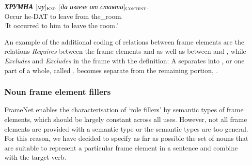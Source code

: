 \documentclass[output=paper,colorlinks,citecolor=brown]{langscibook}
\begin{document}
\begin{exe}
 \ex  \label{ch01:ex:43}
 \gll \textit{\textbf{ХРУМНА}}   [\textit{му}]$_{\text{\textsc{Exp}}}$  [\textit{да}   \textit{излезе}  \textit{от} \textit{стаята}]$_{\text{\textsc{Content}}}$. \\
 Occur  he-DAT to leave  from  the\_room. \\
 \glt `It occurred to him to leave the room.'
 \end{exe} 
 
An example of the additional coding of relations between frame elements are the relations \textit{Requires} between the frame elements  and  as well as between  and , while  \textit{Excludes}  and  \textit{Excludes}  in the frame  with the definition: A  separates into , or one part of a whole, called , becomes separate from the remaining portion, .

\subsubsection{Noun frame element fillers}

FrameNet enables the characterisation of `role fillers' by semantic types of frame elements, which should be largely constant across all uses. However, not all frame elements are provided with a semantic type or the semantic types are too general. For this reason, we have decided to specify as far as possible the set of nouns that are suitable to represent a particular frame element in a sentence and combine with the target verb.
\end{document}
